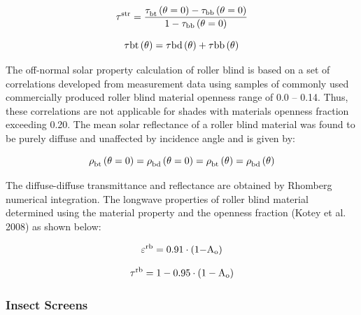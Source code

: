{\begin{equation}
{\rm{\tau }}_{}^{{\rm{str}}} = \frac{{{\rm{\tau }}_{{\rm{bt}}}^{}\left( {{\rm{\theta }} = {\rm{0}}} \right) - {{\rm{\tau }}_{{\rm{bb}}}}\left( {{\rm{\theta }} = {\rm{0}}} \right)}}{{{\rm{1}} - {{\rm{\tau }}_{{\rm{bb}}}}\left( {{\rm{\theta }} = {\rm{0}}} \right)}}
\end{equation}

\begin{equation}
{\rm{\tau bt}}\left( {\rm{\theta }} \right) = {\rm{\tau bd}}\left( {\rm{\theta }} \right) + {\rm{\tau bb}}\left( {\rm{\theta }} \right)
\end{equation}

The off-normal solar property calculation of roller blind is based on a set of correlations developed from measurement data using samples of commonly used commercially produced roller blind material openness range of 0.0 -- 0.14. Thus, these correlations are not applicable for shades with materials openness fraction exceeding 0.20. The mean solar reflectance of a roller blind material was found to be purely diffuse and unaffected by incidence angle and is given by:

\begin{equation}
{\rm{\rho }}_{{\rm{bt}}}^{}\left( {{\rm{\theta }} = {\rm{0}}} \right) = {\rm{\rho }}_{{\rm{bd}}}^{}\left( {{\rm{\theta }} = {\rm{0}}} \right) = {\rm{\rho }}_{{\rm{bt}}}^{}\left( {\rm{\theta }} \right) = {\rm{\rho }}_{{\rm{bd}}}^{}\left( {\rm{\theta }} \right)
\end{equation}

The diffuse-diffuse transmittance and reflectance are obtained by Rhomberg numerical integration. The longwave properties of roller blind material determined using the material property and the openness fraction (Kotey et al. 2008) as shown below:

\begin{equation}
{\varepsilon ^{{\rm{rb}}}} = {\rm{0}}{\rm{.91}} \cdot \left( {{\rm{1 - }}{{\rm{A}}_{\rm{o}}}} \right)
\end{equation}

\begin{equation}
{\tau ^{{\rm{rb}}}} = {\rm{1}} - {\rm{0}}{\rm{.95}} \cdot \left( {{\rm{1}} - {{\rm{A}}_{\rm{o}}}} \right)
\end{equation}

\subsubsection{Insect Screens}\label{insect-screens}

}
